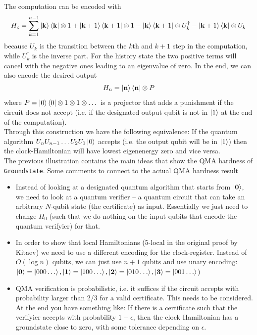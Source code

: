 The computation can be encoded with 
\begin{align}
    H_c = \sum_{k=1}^{n-1} \ket{\mathbf{k}}\bra{\mathbf{k}}\otimes 1 + \ket{\mathbf{k}+1}\bra{\mathbf{k}+1}\otimes 1 - \ket{\mathbf{k}}\bra{\mathbf{k}+1} \otimes U^\dagger_{k} - \ket{\mathbf{k}+1}\bra{\mathbf{k}} \otimes U_{k}
\end{align}
because $U_k$ is the transition between the $k$th and $k+1$ step in the computation, while $U_k^\dagger$ is the inverse part. For the history state the two positive terms will cancel with the negative ones leading to an eigenvalue of zero.
In the end, we can also encode the desired output
\begin{align}
    H_n = \ket{\mathbf{n}}\bra{\mathbf{n}}\otimes P
\end{align}
where $P=\ket{0}\bra{0}\otimes 1\otimes 1\otimes \dots $ is a projector that adds a punishment if the circuit does not accept (i.e. if the designated output qubit is not in $\ket{1}$ at the end of the computation).\\

Through this construction we have the following equivalence: If the quantum algorithm $U_nU_{n-1}\dots U_2U_1\ket{0}$ accepts (i.e. the output qubit will be in $\ket{1}$) then the clock-Hamiltonian will have lowest eigenenergy zero and vice versa.\\

The previous illustration contains the main ideas that show the $\mathrm{QMA}$ hardness of \texttt{Groundstate}. Some comments to connect to the actual $\mathrm{QMA}$ hardness result
\begin{itemize}
    \item Instead of looking at a designated quantum algorithm that starts from $\ket{\mathbf0}$, we need to look at a quantum verifier -- a quantum circuit that can take an arbitrary $N$-qubit state (the certificate) as input. Essentially we just need to change $H_0$ (such that we do nothing on the input qubits that encode the quantum verifyier) for that.
    \item In order to show that local Hamiltonians (5-local in the original proof by Kitaev) we need to use a different encoding for the clock-register. Instead of $O(\log n)$ qubits, we can just use $n+1$ qubits and use unary encoding: $\ket{\mathbf{0}}=\ket{000\dots}, \ket{\mathbf{1}}=\ket{100\dots}, \ket{\mathbf{2}}=\ket{010\dots }, \ket{\mathbf{3}}=\ket{001\dots}$)
    \item $\mathrm{QMA}$ verification is probabilistic, i.e. it suffices if the circuit accepts with probability larger than 2/3 for a valid certificate. This needs to be considered. At the end you have something like: If there is a certificate such that the verifyier accepts with probability $1-\epsilon$, then the clock Hamiltonian has a groundstate close to zero, with some tolerance depending on $\epsilon$.
\end{itemize}
